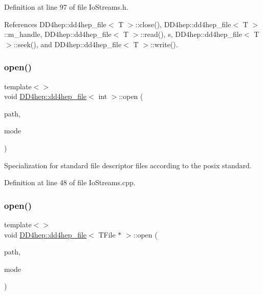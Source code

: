 Definition at line 97 of file Io\+Streams.\+h.



References D\+D4hep\+::dd4hep\+\_\+file$<$ T $>$\+::close(), D\+D4hep\+::dd4hep\+\_\+file$<$ T $>$\+::m\+\_\+handle, D\+D4hep\+::dd4hep\+\_\+file$<$ T $>$\+::read(), s, D\+D4hep\+::dd4hep\+\_\+file$<$ T $>$\+::seek(), and D\+D4hep\+::dd4hep\+\_\+file$<$ T $>$\+::write().

\hypertarget{class_d_d4hep_1_1dd4hep__file_adc9dd31804b03c96f3fdb4525b97d96e}{}\label{class_d_d4hep_1_1dd4hep__file_adc9dd31804b03c96f3fdb4525b97d96e} 
\subsubsection{\texorpdfstring{open()}{open()}\hspace{0.1cm}{\footnotesize\ttfamily [1/4]}}
{\footnotesize\ttfamily template$<$$>$ \\
void \hyperlink{class_d_d4hep_1_1dd4hep__file}{D\+D4hep\+::dd4hep\+\_\+file}$<$ int $>$\+::open (\begin{DoxyParamCaption}\item[{const char $\ast$}]{path,  }\item[{B\+O\+O\+S\+T\+\_\+\+I\+O\+S\+::openmode}]{mode }\end{DoxyParamCaption})}



Specialization for standard file descriptor files according to the posix standard. 



Definition at line 48 of file Io\+Streams.\+cpp.

\hypertarget{class_d_d4hep_1_1dd4hep__file_aa578d0326b3a566f21afcada83a3a1d6}{}\label{class_d_d4hep_1_1dd4hep__file_aa578d0326b3a566f21afcada83a3a1d6} 
\subsubsection{\texorpdfstring{open()}{open()}\hspace{0.1cm}{\footnotesize\ttfamily [2/4]}}
{\footnotesize\ttfamily template$<$$>$ \\
void \hyperlink{class_d_d4hep_1_1dd4hep__file}{D\+D4hep\+::dd4hep\+\_\+file}$<$ T\+File $\ast$ $>$\+::open (\begin{DoxyParamCaption}\item[{const char $\ast$}]{path,  }\item[{B\+O\+O\+S\+T\+\_\+\+I\+O\+S\+::openmode}]{mode }\end{DoxyParamCaption})}



